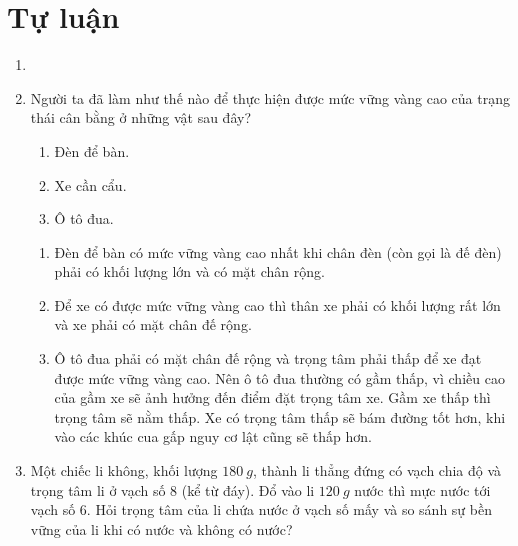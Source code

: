 \section{Tự luận}
\begin{enumerate}[label=\bfseries Câu \arabic*:]
	\item {}
	
	
	
	\item {}
	
	\cauhoi
	{Người ta đã làm như thế nào để thực hiện được mức vững vàng cao của trạng thái cân bằng ở những vật sau đây?
		\begin{enumerate}[label=\alph*.]
			\item Đèn để bàn.
			\item  Xe cần cẩu.
			\item Ô tô đua.
		\end{enumerate}
	}
	
	\loigiai
	{
		\begin{enumerate}[label=\alph*.]
		\item Đèn để bàn có mức vững vàng cao nhất khi chân đèn (còn  gọi là đế đèn) phải có khối lượng lớn và có mặt chân rộng.
		\item Để xe có được mức vững vàng cao thì thân xe phải có khối lượng rất lớn và xe phải có mặt chân đế rộng. 
		\item Ô tô đua phải có mặt chân đế rộng và trọng tâm phải thấp để xe đạt được mức vững vàng cao. Nên ô tô đua thường có gầm thấp, vì chiều cao của gầm xe sẽ ảnh hưởng đến điểm đặt trọng tâm xe. Gầm xe thấp thì trọng tâm sẽ nằm thấp. Xe có trọng tâm thấp sẽ bám đường tốt hơn, khi vào các khúc cua gấp nguy cơ lật cũng sẽ thấp hơn. 
	\end{enumerate}
	}
	\item {}
	
	\cauhoi
	{Một chiếc li không, khối lượng $\SI{180}{g}$, thành li thẳng đứng có vạch chia độ và trọng tâm li ở vạch số 8 (kể từ đáy). Đổ vào li $\SI{120}{g}$ nước thì mực nước tới vạch số 6. Hỏi trọng tâm của li chứa nước ở vạch số mấy và so sánh sự bền vững của li khi có nước và không có nước?
	}
	

\end{enumerate}

